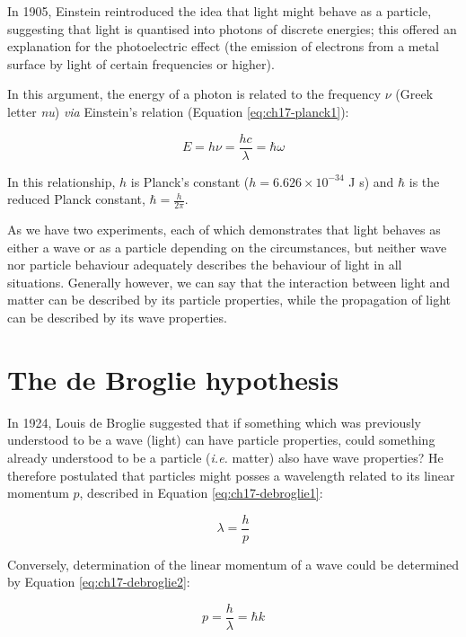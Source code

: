\documentclass[
]{book}
\begin{document}
In 1905, Einstein reintroduced the idea that light might behave as a particle, suggesting that light is quantised into photons of discrete energies; this offered an explanation for the photoelectric effect (the emission of electrons from a metal surface by light of certain frequencies or higher).

In this argument, the energy of a photon is related to the frequency \(\nu\) (Greek letter \emph{nu}) \emph{via} Einstein's relation (Equation \eqref{eq:ch17-planck1}):

\begin{equation}
E = h \nu = \frac{hc}{\lambda} = \hbar \omega
\label{eq:ch17-planck1}
\end{equation}

In this relationship, \(h\) is Planck's constant (\(h = 6.626 \times 10^{-34}\) J s) and \(\hbar\) is the reduced Planck constant, \(\hbar = \frac{h}{2\pi}\).

As we have two experiments, each of which demonstrates that light behaves as either a wave or as a particle depending on the circumstances, but neither wave nor particle behaviour adequately describes the behaviour of light in all situations. Generally however, we can say that the interaction between light and matter can be described by its particle properties, while the propagation of light can be described by its wave properties.

\hypertarget{sec:ch17-debrogliehyp1}{%
\section{The de Broglie hypothesis}\label{sec:ch17-debrogliehyp1}}

In 1924, Louis de Broglie suggested that if something which was previously understood to be a wave (light) can have particle properties, could something already understood to be a particle (\emph{i.e.} matter) also have wave properties? He therefore postulated that particles might posses a wavelength related to its linear momentum \(p\), described in Equation \eqref{eq:ch17-debroglie1}:

\begin{equation}
\lambda = \frac{h}{p}
\label{eq:ch17-debroglie1}
\end{equation}

Conversely, determination of the linear momentum of a wave could be determined by Equation \eqref{eq:ch17-debroglie2}:

\begin{equation}
p = \frac{h}{\lambda} = \hbar k
\label{eq:ch17-debroglie2}
\end{equation}
\end{document}
